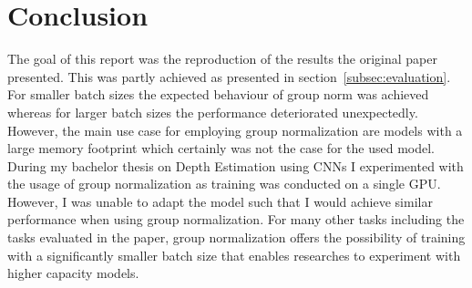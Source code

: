 \section{Conclusion}\label{sec:conclusion}
The goal of this report was the reproduction of the results the original paper presented.
This was partly achieved as presented in section~\ref{subsec:evaluation}.
For smaller batch sizes the expected behaviour of group norm was achieved whereas for larger batch sizes the performance deteriorated unexpectedly.
However, the main use case for employing group normalization are models with a large memory footprint which certainly was not the case for the used model.
During my bachelor thesis on Depth Estimation using CNNs I experimented with the usage of group normalization as training was conducted on a single GPU.
However, I was unable to adapt the model such that I would achieve similar performance when using group normalization.
For many other tasks including the tasks evaluated in the paper, group normalization offers the possibility of training with a significantly smaller batch size that enables researches to experiment with higher capacity models.
